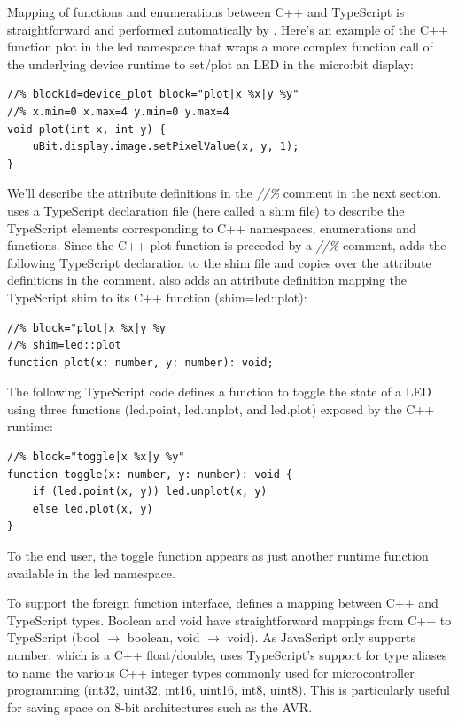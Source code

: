 Mapping of functions and enumerations between C++ and TypeScript is straightforward
and performed automatically by \MC. 
Here's an example of the C++ function plot in the led namespace that wraps a more
complex function call of the underlying device runtime to set/plot an LED in the micro:bit display:

\begin{lstlisting}
//% blockId=device_plot block="plot|x %x|y %y"
//% x.min=0 x.max=4 y.min=0 y.max=4
void plot(int x, int y) {
    uBit.display.image.setPixelValue(x, y, 1);
}
\end{lstlisting}

We'll describe the attribute definitions in the \emph{//\%} comment in the next section. 
\MC uses a TypeScript declaration file (here called a shim file) to describe the TypeScript elements corresponding
to C++ namespaces, enumerations and functions.
Since the C++ plot function is preceded by a \emph{//\%} comment, 
\MC adds the following TypeScript declaration to the shim file and copies
over the attribute definitions in the comment. \MC also adds an attribute definition mapping
the TypeScript shim to its C++ function (shim=led::plot):

\begin{lstlisting}
//% block="plot|x %x|y %y
//% shim=led::plot
function plot(x: number, y: number): void;
\end{lstlisting}

The following TypeScript code defines a function to toggle the state of a LED
using three functions (led.point, led.unplot, and led.plot) exposed by the C++ runtime:  
\begin{lstlisting}
//% block="toggle|x %x|y %y"
function toggle(x: number, y: number): void {
    if (led.point(x, y)) led.unplot(x, y)
    else led.plot(x, y)
}
\end{lstlisting}
To the end user, the toggle function appears as just another runtime function available
in the led namespace. 


To support the foreign function interface, \MC defines a mapping between C++ and TypeScript types.
Boolean and void have straightforward mappings from C++ to TypeScript (bool $\rightarrow$ boolean, void $\rightarrow$ void). 
As JavaScript only supports number, which is a C++ float/double, \MC uses TypeScript's support
for type aliases to name the various C++ integer types commonly used for microcontroller programming
(int32, uint32, int16, uint16, int8, uint8). 
This is particularly useful for saving space on 8-bit architectures such as the AVR. 

